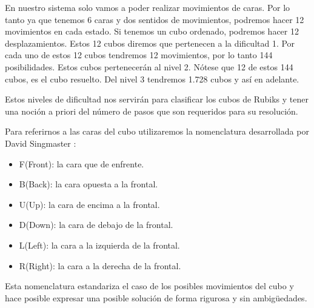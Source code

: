 En nuestro sistema solo vamos a poder realizar movimientos de caras. Por lo tanto ya que tenemos 6 caras y dos
sentidos de movimientos, podremos hacer 12 movimientos en cada estado. Si tenemos un cubo ordenado, podremos
hacer 12 desplazamientos. Estos 12 cubos diremos que pertenecen a la dificultad 1. Por cada uno de estos 12
cubos tendremos 12 movimientos, por lo tanto 144 posibilidades. Estos cubos pertenecerán al nivel 2. Nótese que
12 de estos 144 cubos, es el cubo resuelto. Del nivel 3 tendremos 1.728 cubos y así en adelante.

Estos niveles de dificultad nos servirán para clasificar los cubos de Rubiks y tener una noción a priori del
número de pasos que son requeridos para su resolución.

Para referirnos a las caras del cubo utilizaremos la nomenclatura desarrollada
por David Singmaster  \cite{Singmaster:1981}:

\begin{itemize}
  \item F(Front): la cara que de enfrente. 
  \item B(Back): la cara opuesta a la frontal. 
  \item U(Up): la cara de encima a la frontal. 
  \item D(Down): la cara de debajo de la frontal.
  \item L(Left): la cara a la izquierda de la frontal. 
  \item R(Right): la cara a la derecha de la frontal.
\end{itemize}

Esta nomenclatura estandariza el caso de los posibles movimientos del cubo y hace posible expresar una posible
solución de forma rigurosa y sin ambigüedades.
